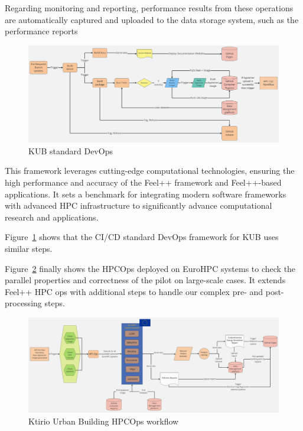 \documentclass[runningheads]{llncs}
\begin{document}
Regarding monitoring and reporting, performance results from these operations are automatically captured and uploaded to the data storage system, such as the performance reports 

\begin{figure}
    \centering
    \includegraphics[width=\linewidth]{img-ub-devops.pdf}
    \caption{KUB standard DevOps}
    \label{fig:kub-devops}
\end{figure}
This framework leverages cutting-edge computational technologies, ensuring the high performance and accuracy of the Feel++ framework and Feel++-based applications. 
It sets a benchmark for integrating modern software frameworks with advanced HPC infrastructure to significantly advance computational research and applications.

Figure~\ref{fig:kub-devops} shows that the CI/CD standard DevOps framework for KUB uses similar steps.



Figure~\ref{fig:kub-hpcops} finally shows the HPCOps deployed on EuroHPC systems to check the parallel properties and correctness of the pilot on large-scale cases. It extends Feel++ HPC ops with additional steps to handle our complex pre- and post-processing steps.

\begin{figure}
    \centering
    \includegraphics[width=\textwidth]{img-ub-hpcops.pdf}
    \caption{Ktirio Urban Building HPCOps workflow}
    \label{fig:kub-hpcops}
\end{figure}
\end{document}
